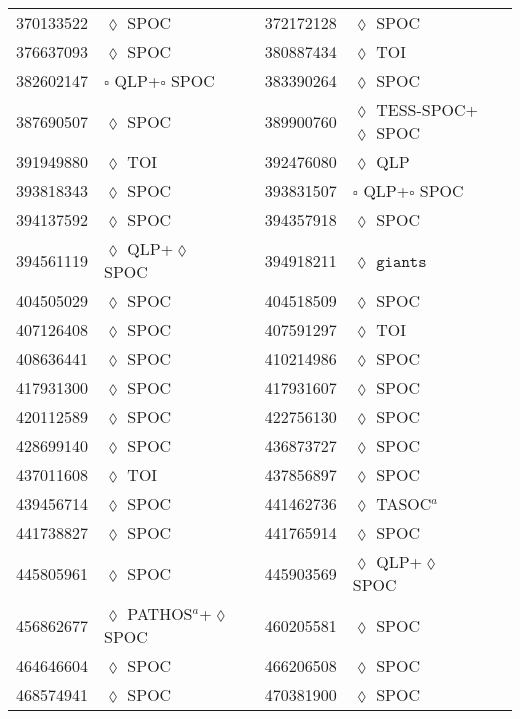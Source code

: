 \begin{longtable}{llrllr}
370133522 & $\lozenge$ SPOC & \cite{TIC_103633434} & 372172128 & $\lozenge$ SPOC & \cite{TIC_372172128} \\
376637093 & $\lozenge$ SPOC & \cite{TIC_376637093} & 380887434 & $\lozenge$ TOI & \cite{TIC_154872375} \\
382602147 & $\square$ QLP+$\square$ SPOC & \cite{TIC_201177276} & 383390264 & $\lozenge$ SPOC & \cite{TIC_383390264} \\
387690507 & $\lozenge$ SPOC & \cite{TIC_387690507} & 389900760 & $\lozenge$ TESS-SPOC+$\lozenge$ SPOC & \cite{TIC_343628284} \\
391949880 & $\lozenge$ TOI & \cite{TIC_154872375} & 392476080 & $\lozenge$ QLP & \cite{TIC_392476080} \\
393818343 & $\lozenge$ SPOC & \cite{TIC_393818343} & 393831507 & $\square$ QLP+$\square$ SPOC & \cite{TIC_393831507} \\
394137592 & $\lozenge$ SPOC & \cite{TIC_394137592} & 394357918 & $\lozenge$ SPOC & \cite{TIC_441738827} \\
394561119 & $\lozenge$ QLP+$\lozenge$ SPOC & \cite{TIC_394561119} & 394918211 & $\lozenge$ $\texttt{giants}$ & \cite{TIC_394918211} \\
404505029 & $\lozenge$ SPOC & \cite{TIC_404505029} & 404518509 & $\lozenge$ SPOC & \cite{TIC_404518509} \\
407126408 & $\lozenge$ SPOC & \cite{TIC_428699140} & 407591297 & $\lozenge$ TOI & \cite{TIC_154872375} \\
408636441 & $\lozenge$ SPOC & \cite{TIC_408636441} & 410214986 & $\lozenge$ SPOC & \cite{TIC_410214986} \\
417931300 & $\lozenge$ SPOC & \cite{TIC_159418353} & 417931607 & $\lozenge$ SPOC & \cite{TIC_232540264} \\
420112589 & $\lozenge$ SPOC & \cite{TIC_420112589} & 422756130 & $\lozenge$ SPOC & \cite{TIC_422756130} \\
428699140 & $\lozenge$ SPOC & \cite{TIC_428699140} & 436873727 & $\lozenge$ SPOC & \cite{TIC_436873727} \\
437011608 & $\lozenge$ TOI & \cite{TIC_154872375} & 437856897 & $\lozenge$ SPOC & \cite{TIC_437856897} \\
439456714 & $\lozenge$ SPOC & \cite{TIC_439456714} & 441462736 & $\lozenge$ TASOC$^a$ & \cite{TIC_441462736} \\
441738827 & $\lozenge$ SPOC & \cite{TIC_441738827} & 441765914 & $\lozenge$ SPOC & \cite{TIC_232540264} \\
445805961 & $\lozenge$ SPOC & \cite{TIC_445805961} & 445903569 & $\lozenge$ QLP+$\lozenge$ SPOC & \cite{TIC_445903569} \\
456862677 & $\lozenge$ PATHOS$^a$+$\lozenge$ SPOC & \cite{TIC_456862677} & 460205581 & $\lozenge$ SPOC & \cite{TIC_460205581} \\
464646604 & $\lozenge$ SPOC & \cite{TIC_464646604} & 466206508 & $\lozenge$ SPOC & \cite{TIC_466206508} \\
468574941 & $\lozenge$ SPOC & \cite{TIC_376637093} & 470381900 & $\lozenge$ SPOC & \cite{TIC_470381900} \\


\end{longtable}
